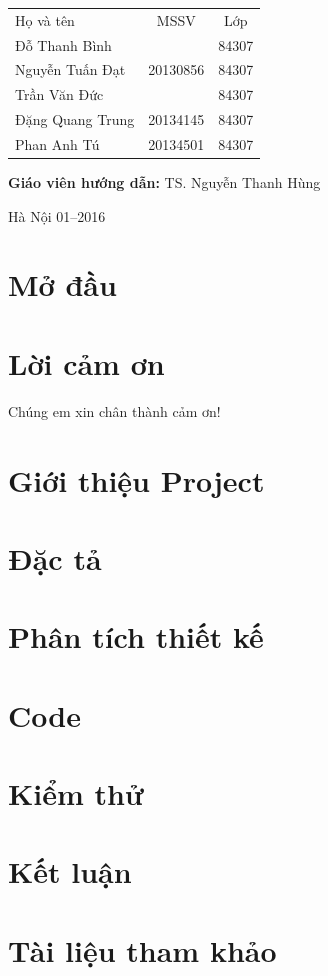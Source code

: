 \documentclass[a4paper,12pt]{report}
\begin{document}
\begin{longtable}{l c c}

Họ và tên & MSSV  & Lớp\\
Đỗ Thanh Bình &  & 84307 \\
Nguyễn Tuấn Đạt &  20130856 & 84307 \\
Trần Văn  Đức &  & 84307 \\
Đặng Quang Trung & 20134145  & 84307 \\
Phan Anh Tú & 20134501  & 84307 \\

\end{longtable}

\hspace{1cm}\fontsize{14}{16}\selectfont \textbf{Giáo viên hướng dẫn: }TS. Nguyễn Thanh Hùng\\[2cm]
\begin{center}
\fontsize{16}{19}\selectfont Hà Nội 01--2016

\end{center}
\newpage
\tableofcontents
\chapter*{Mở đầu}





\chapter*{Lời cảm ơn}
{}
Chúng em xin chân thành cảm ơn!
\listoftables
\listoffigures
\chapter{Giới thiệu Project}
\chapter{Đặc tả}
\chapter{Phân tích thiết kế}
\chapter{Code}
\chapter{Kiểm thử}
\chapter{Kết luận}
\chapter*{Tài liệu tham khảo}
{}
\end{document}
